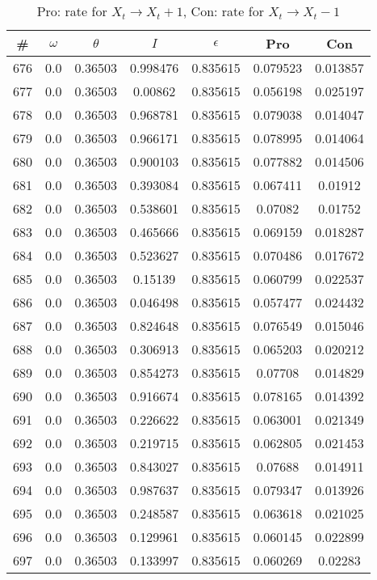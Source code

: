 \newpage
\begin{table}
\caption{Pro: rate for $X_t \rightarrow X_t + 1$, Con: rate for $X_t \rightarrow X_t - 1$}
\begin{tabular*}{\linewidth}{c|c|c|c|c|c|c}
\# & $\omega$ & $\theta$ & $I$ & $\epsilon$ & Pro & Con \\
\hline
676 & 0.0 & 0.36503 & 0.998476 & 0.835615 & 0.079523 & 0.013857\\
677 & 0.0 & 0.36503 & 0.00862 & 0.835615 & 0.056198 & 0.025197\\
678 & 0.0 & 0.36503 & 0.968781 & 0.835615 & 0.079038 & 0.014047\\
679 & 0.0 & 0.36503 & 0.966171 & 0.835615 & 0.078995 & 0.014064\\
680 & 0.0 & 0.36503 & 0.900103 & 0.835615 & 0.077882 & 0.014506\\
681 & 0.0 & 0.36503 & 0.393084 & 0.835615 & 0.067411 & 0.01912\\
682 & 0.0 & 0.36503 & 0.538601 & 0.835615 & 0.07082 & 0.01752\\
683 & 0.0 & 0.36503 & 0.465666 & 0.835615 & 0.069159 & 0.018287\\
684 & 0.0 & 0.36503 & 0.523627 & 0.835615 & 0.070486 & 0.017672\\
685 & 0.0 & 0.36503 & 0.15139 & 0.835615 & 0.060799 & 0.022537\\
686 & 0.0 & 0.36503 & 0.046498 & 0.835615 & 0.057477 & 0.024432\\
687 & 0.0 & 0.36503 & 0.824648 & 0.835615 & 0.076549 & 0.015046\\
688 & 0.0 & 0.36503 & 0.306913 & 0.835615 & 0.065203 & 0.020212\\
689 & 0.0 & 0.36503 & 0.854273 & 0.835615 & 0.07708 & 0.014829\\
690 & 0.0 & 0.36503 & 0.916674 & 0.835615 & 0.078165 & 0.014392\\
691 & 0.0 & 0.36503 & 0.226622 & 0.835615 & 0.063001 & 0.021349\\
692 & 0.0 & 0.36503 & 0.219715 & 0.835615 & 0.062805 & 0.021453\\
693 & 0.0 & 0.36503 & 0.843027 & 0.835615 & 0.07688 & 0.014911\\
694 & 0.0 & 0.36503 & 0.987637 & 0.835615 & 0.079347 & 0.013926\\
695 & 0.0 & 0.36503 & 0.248587 & 0.835615 & 0.063618 & 0.021025\\
696 & 0.0 & 0.36503 & 0.129961 & 0.835615 & 0.060145 & 0.022899\\
697 & 0.0 & 0.36503 & 0.133997 & 0.835615 & 0.060269 & 0.02283\\

\end{tabular*}
\end{table}
